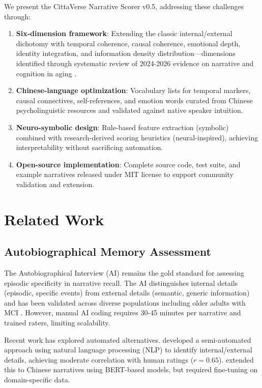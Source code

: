 \documentclass[11pt]{article}
\begin{document}
We present the CittaVerse Narrative Scorer v0.5, addressing these challenges through:

\begin{enumerate}
  \item \textbf{Six-dimension framework}: Extending the classic internal/external dichotomy \cite{levine2002} with temporal coherence, causal coherence, emotional depth, identity integration, and information density distribution—dimensions identified through systematic review of 2024-2026 evidence on narrative and cognition in aging \cite{pu2025, wang2026, yang2026}.
  \item \textbf{Chinese-language optimization}: Vocabulary lists for temporal markers, causal connectives, self-references, and emotion words curated from Chinese psycholinguistic resources and validated against native speaker intuition.
  \item \textbf{Neuro-symbolic design}: Rule-based feature extraction (symbolic) combined with research-derived scoring heuristics (neural-inspired), achieving interpretability without sacrificing automation.
  \item \textbf{Open-source implementation}: Complete source code, test suite, and example narratives released under MIT license to support community validation and extension.
\end{enumerate}

\section{Related Work}

\subsection{Autobiographical Memory Assessment}

The Autobiographical Interview (AI) \cite{levine2002} remains the gold standard for assessing episodic specificity in narrative recall. The AI distinguishes internal details (episodic, specific events) from external details (semantic, generic information) and has been validated across diverse populations including older adults with MCI \cite{murphy2021}. However, manual AI coding requires 30-45 minutes per narrative and trained raters, limiting scalability.

Recent work has explored automated alternatives. \citet{rosenbaum2020} developed a semi-automated approach using natural language processing (NLP) to identify internal/external details, achieving moderate correlation with human ratings ($r = 0.65$). \citet{chen2022} extended this to Chinese narratives using BERT-based models, but required fine-tuning on domain-specific data.
\end{document}
